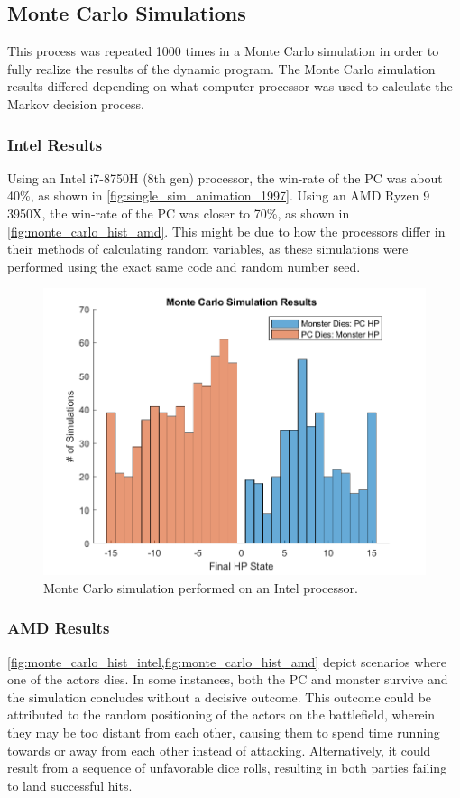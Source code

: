 \documentclass[letterpaper, 10 pt, conference]{ieeeconf}
\begin{document}
\subsection{Monte Carlo Simulations}
This process was repeated 1000 times in a Monte Carlo simulation in order to fully realize the results of the dynamic program. 
The Monte Carlo simulation results differed depending on what computer processor was used to calculate the Markov decision process. 
\subsubsection{Intel Results}
Using an Intel i7-8750H (8th gen) processor, the win-rate of the PC was about 40\%, as shown in \cref{fig:single_sim_animation_1997}. 
Using an AMD Ryzen 9 3950X, the win-rate of the PC was closer to 70\%, as shown in \cref{fig:monte_carlo_hist_amd}. 
This might be due to how the processors differ in their methods of calculating random variables, as these simulations were performed using the exact same code and random number seed.

\begin{figure}[thb]
    \centering
    \includegraphics[scale = 0.5]{figs/DND_monte_carlo_hist.png}
    \caption{Monte Carlo simulation performed on an Intel processor.}
    \label{fig:monte_carlo_hist_intel}
\end{figure}

\subsubsection{AMD Results}
\cref{fig:monte_carlo_hist_intel,fig:monte_carlo_hist_amd} depict scenarios where one of the actors dies. 
In some instances, both the PC and monster survive and the simulation concludes without a decisive outcome. 
This outcome could be attributed to the random positioning of the actors on the battlefield, wherein they may be too distant from each other, causing them to spend time running towards or away from each other instead of attacking. 
Alternatively, it could result 
from a sequence of unfavorable dice rolls, resulting in both parties failing to land successful hits.
\end{document}
